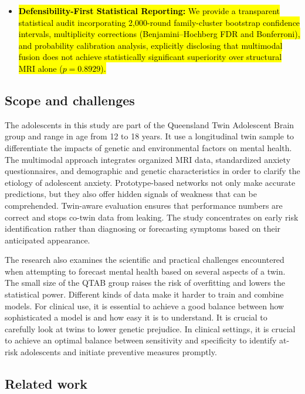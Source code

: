 \documentclass[10pt,letterpaper]{article}
\begin{document}
\begin{itemize}
        \item \hl{\textbf{Defensibility-First Statistical Reporting:} We provide a transparent statistical audit incorporating 2,000-round family-cluster bootstrap confidence intervals, multiplicity corrections (Benjamini--Hochberg FDR and Bonferroni), and probability calibration analysis, explicitly disclosing that multimodal fusion does not achieve statistically significant superiority over structural MRI alone ($p = 0.8929$).}
        
        \end{itemize}

\subsection*{Scope and challenges}
        The adolescents in this study are part of the Queensland Twin Adolescent Brain group and range in age from 12 to 18 years. It use a longitudinal twin sample to differentiate the impacts of genetic and environmental factors on mental health. The multimodal approach integrates organized MRI data, standardized anxiety questionnaires, and demographic and genetic characteristics in order to clarify the etiology of adolescent anxiety. Prototype-based networks not only make accurate predictions, but they also offer hidden signals of weakness that can be comprehended. Twin-aware evaluation ensures that performance numbers are correct and stops co-twin data from leaking. The study concentrates on early risk identification rather than diagnosing or forecasting symptoms based on their anticipated appearance.

        The research also examines the scientific and practical challenges encountered when attempting to forecast mental health based on several aspects of a twin. The small size of the QTAB group raises the risk of overfitting and lowers the statistical power. Different kinds of data make it harder to train and combine models. For clinical use, it is essential to achieve a good balance between how sophisticated a model is and how easy it is to understand. It is crucial to carefully look at twins to lower genetic prejudice. In clinical settings, it is crucial to achieve an optimal balance between sensitivity and specificity to identify at-risk adolescents and initiate preventive measures promptly.

        \subsection*{Related work}
\end{document}
